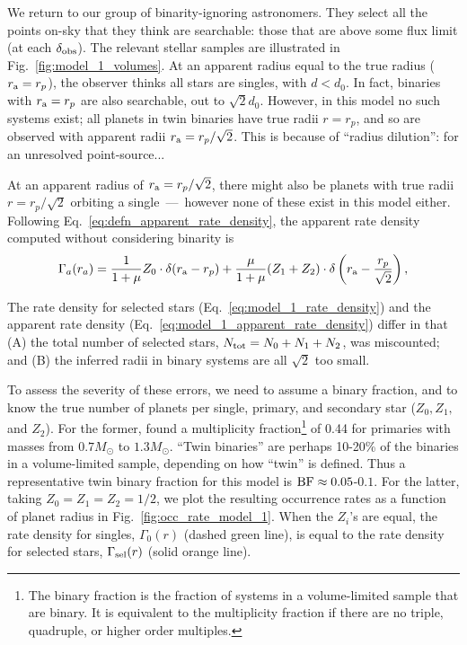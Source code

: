 \documentclass[12pt,modern]{aastex61}
\renewcommand{\a}{_{\rm a}}
\begin{document}
We return to our group of binarity-ignoring astronomers. They select all the 
points on-sky that they think are searchable: those that are above some flux 
limit (at each $\delta_{\rm obs}$).
The relevant stellar samples are illustrated in Fig.~\ref{fig:model_1_volumes}.
At an apparent radius equal to the true radius ($r\a=r_p$), the observer 
thinks all stars are singles, with $d<d_0$.
In fact, binaries with $r\a=r_p$ are also searchable, out to $\sqrt{2}d_0$. 
However, in this model no such systems exist; all planets in twin binaries 
have true radii $r=r_p$, and so are observed with apparent radii 
$r\a=r_p/\sqrt{2}$.
This is because of ``radius dilution'':
for an unresolved point-source... %

At an apparent radius of $r\a=r_p/\sqrt{2}$, there might also be planets with 
true radii $r=r_p/\sqrt{2}$ orbiting a single~---~however none of these exist 
in this model either.
Following Eq.~\ref{eq:defn_apparent_rate_density}, the apparent rate density 
computed without considering binarity is
\begin{equation}
\Gamma_a(r_a) = 
\frac{1}{1+\mu} Z_0 \cdot
\delta(r\a-r_p)  +
\frac{\mu}{1+\mu} (Z_1 + Z_2) \cdot
\delta\left(r\a-\frac{r_p}{\sqrt{2}} \right),
\label{eq:model_1_apparent_rate_density}
\end{equation}

The rate density for selected stars (Eq.~\ref{eq:model_1_rate_density}) and the
apparent rate density (Eq.~\ref{eq:model_1_apparent_rate_density}) differ in 
that (A) the total number of selected stars, $N_{\rm tot} = N_0+N_1+N_2$, was 
miscounted; and (B) the inferred radii in binary systems are all $\sqrt{2}$ 
too small.

To assess the severity of these errors, we need to assume a binary fraction, 
and to know the true number of planets per single, primary, and secondary star 
($Z_0,Z_1,$ and $Z_2$).
For the former,
\citet{raghavan_survey_2010} found a multiplicity 
fraction\footnote{
    The binary fraction is the fraction of systems in a volume-limited sample 
    that are binary. It is equivalent to the multiplicity fraction if there 
    are no triple, quadruple, or higher order multiples.
} of 0.44 for primaries with masses from $0.7M_\odot$ to $1.3M_\odot$. 
``Twin binaries'' are perhaps 10-20\% of the binaries in a volume-limited 
sample, depending on how ``twin'' is defined.
Thus a representative twin binary fraction for this model is ${\rm BF}\approx 
0.05$-$0.1$. 
For the latter, taking $Z_0=Z_1=Z_2=1/2$, we plot the resulting occurrence 
rates as a function of planet radius in Fig.~\ref{fig:occ_rate_model_1}.
When the $Z_i$'s are equal, the rate density for singles, $\Gamma_0(r)$ 
(dashed green line), is equal to the rate density for selected stars, 
$\Gamma_{\rm sel}(r)$ (solid orange line).
\end{document}

